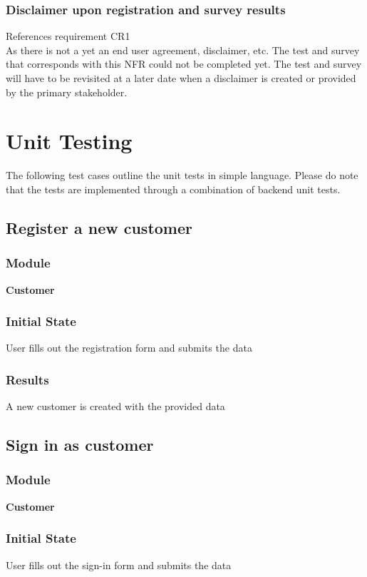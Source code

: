 \documentclass[12pt, titlepage]{article}
\begin{document}
    \subsubsection{Disclaimer upon registration and survey results}
        References requirement CR1\\
        As there is not a yet an end user agreement, disclaimer, etc. The test and survey that corresponds with this NFR could not be completed yet. The test and survey will have to be revisited at a later date when a disclaimer is created or provided by the primary stakeholder.

\section{Unit Testing}

The following test cases outline the unit tests in simple language. Please do note that the tests are implemented through a combination of backend unit tests.

\subsection{Register a new customer}
    \subsubsection{Module}
    \textbf{Customer}
    \subsubsection{Initial State}
    User fills out the registration form and submits the data
    \subsubsection{Results}
    A new customer is created with the provided data

\subsection{Sign in as customer}
    \subsubsection{Module}
    \textbf{Customer}
    \subsubsection{Initial State}
    User fills out the sign-in form and submits the data
\end{document}
